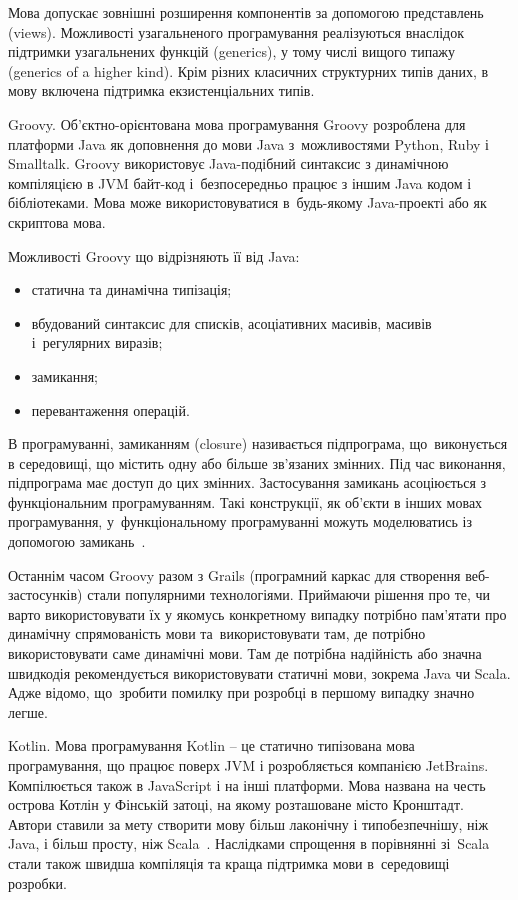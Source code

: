 \documentclass[../main.tex]{subfiles}
\begin{document}
Мова допускає зовнішні розширення компонентів за допомогою представлень (views). Можливості узагальненого програмування реалізуються внаслідок підтримки узагальнених функцій (generics), у тому числі вищого типажу (generics of a higher kind). Крім різних класичних структурних типів даних, в мову включена підтримка екзистенціальних типів.

Groovy.
Об'єктно-орієнтована мова програмування Groovy розроблена для платформи Java як доповнення до мови Java з~можливостями Python, Ruby і Smalltalk. Groovy використовує Java-подібний синтаксис з динамічною компіляцією в JVM байт-код і~безпосередньо працює з іншим Java кодом і бібліотеками. Мова може використовуватися в~будь-якому Java-проекті або як скриптова мова. 

Можливості Groovy що відрізняють її від Java:
\begin{itemize}[label={--}]
	\item статична та динамічна типізація;
	\item вбудований синтаксис для списків, асоціативних масивів, масивів і~регулярних виразів;
	\item замикання;
	\item перевантаження операцій.
\end{itemize}

В програмуванні, замиканням (closure) називається підпрограма, що~виконується в середовищі, що містить одну або більше зв'язаних змінних. Під час виконання, підпрограма має доступ до цих змінних. Застосування замикань асоціюється з функціональним програмуванням. Такі конструкції, як об'єкти в інших мовах програмування, у~функціональному програмуванні можуть моделюватись із допомогою замикань~\cite{groovy}.

Останнім часом Groovy разом з Grails (програмний каркас для створення веб-застосунків) стали популярними технологіями. Приймаючи рішення про те, чи варто використовувати їх у якомусь конкретному випадку потрібно пам’ятати про динамічну спрямованість мови та~використовувати там, де потрібно використовувати саме динамічні мови. Там де потрібна надійність або значна швидкодія рекомендується використовувати статичні мови, зокрема Java чи Scala. Адже відомо, що~зробити помилку при розробці в першому випадку значно легше.

Kotlin.
Мова програмування Kotlin -- це статично типізована мова програмування, що працює поверх JVM і розробляється компанією JetBrains. Компілюється також в JavaScript і на інші платформи. Мова названа на честь острова Котлін у Фінській затоці, на якому розташоване місто Кронштадт. Автори ставили за мету створити мову більш лаконічну і типобезпечнішу, ніж Java, і більш просту, ніж Scala~\cite{open_systems}. Наслідками спрощення в порівнянні зі~Scala стали також швидша компіляція та краща підтримка мови в~середовищі розробки.
\end{document}
